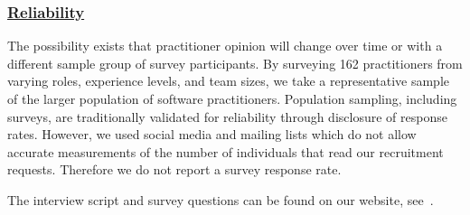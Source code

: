 \subsubsection{\underline{Reliability}}
The possibility exists that practitioner opinion will change over time or with a different sample group of survey participants.
By surveying 162 practitioners from varying roles, experience levels, and team sizes, we take a representative sample of the larger population of software practitioners.
Population sampling, including surveys, are traditionally validated for reliability through disclosure of response rates.
However, we used social media and mailing lists which do not allow accurate measurements of the number of individuals that read our recruitment requests.
Therefore we do not report a survey response rate.

The interview script and survey questions can be found on our website, see~\cite{companion_site}.

